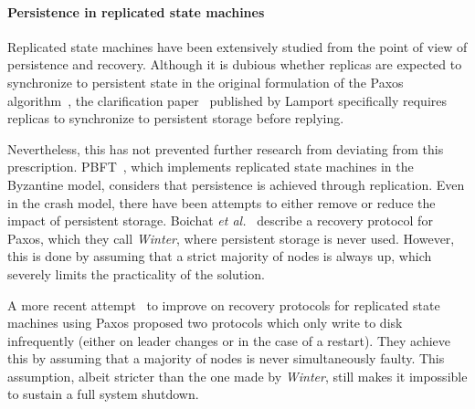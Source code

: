 \paragraph{Persistence in replicated state machines}
Replicated state machines have been extensively studied from the
point of view of persistence and recovery. Although it is dubious
whether replicas are expected to synchronize to persistent state
in the original formulation of the Paxos algorithm~\cite{paxos},
the clarification paper~\cite{paxos-simple} published by Lamport
specifically requires replicas to synchronize to persistent
storage before replying.

Nevertheless, this has not prevented further research
from deviating from this prescription. PBFT~\cite{pbft}, which
implements replicated state machines in the Byzantine model,
considers that persistence is achieved through replication. Even
in the crash model, there have been attempts to either remove or
reduce the impact of persistent storage. Boichat \emph{et
al.}~\cite{winter} describe a recovery protocol for Paxos, which
they call \emph{Winter}, where persistent storage is never used.
However, this is done by assuming that a strict majority of nodes
is always up, which severely limits the practicality of the
solution.

A more recent attempt~\cite{recovery-paxos} to improve on recovery protocols for
replicated state machines using Paxos proposed two protocols
which only write to disk infrequently (either on leader changes
or in the case of a restart). They achieve this by assuming that
a majority of nodes is never simultaneously faulty. This
assumption, albeit stricter than the one made by \emph{Winter},
still makes it impossible to sustain a full system
shutdown.
